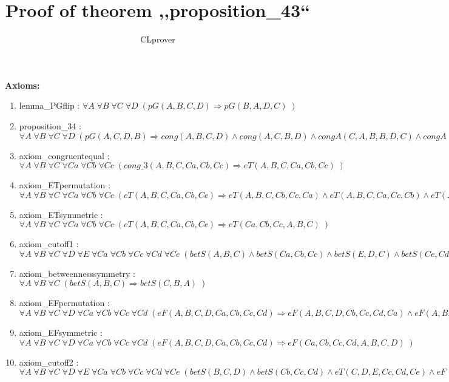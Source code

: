 \documentclass{article}
\begin{document}
\title{Proof of theorem ,,proposition\_43``}
\author{CLprover}
\maketitle

\noindent 
{\bfseries Axioms:} 
\begin{enumerate}
\item lemma\_PGflip : $\forall A \; \forall B \; \forall C \; \forall D \; ( pG(A, B, C, D) \Rightarrow pG(B, A, D, C)\;)$
\item proposition\_34 : $\forall A \; \forall B \; \forall C \; \forall D \; ( pG(A, C, D, B) \Rightarrow cong(A, B, C, D)\wedge cong(A, C, B, D)\wedge congA(C, A, B, B, D, C)\wedge congA(A, B, D, D, C, A)\wedge cong\_3(C, A, B, B, D, C)\;)$
\item axiom\_congruentequal : $\forall A \; \forall B \; \forall C \; \forall Ca \; \forall Cb \; \forall Cc \; ( cong\_3(A, B, C, Ca, Cb, Cc) \Rightarrow eT(A, B, C, Ca, Cb, Cc)\;)$
\item axiom\_ETpermutation : $\forall A \; \forall B \; \forall C \; \forall Ca \; \forall Cb \; \forall Cc \; ( eT(A, B, C, Ca, Cb, Cc) \Rightarrow eT(A, B, C, Cb, Cc, Ca)\wedge eT(A, B, C, Ca, Cc, Cb)\wedge eT(A, B, C, Cb, Ca, Cc)\wedge eT(A, B, C, Cc, Cb, Ca)\wedge eT(A, B, C, Cc, Ca, Cb)\;)$
\item axiom\_ETsymmetric : $\forall A \; \forall B \; \forall C \; \forall Ca \; \forall Cb \; \forall Cc \; ( eT(A, B, C, Ca, Cb, Cc) \Rightarrow eT(Ca, Cb, Cc, A, B, C)\;)$
\item axiom\_cutoff1 : $\forall A \; \forall B \; \forall C \; \forall D \; \forall E \; \forall Ca \; \forall Cb \; \forall Cc \; \forall Cd \; \forall Ce \; ( betS(A, B, C)\wedge betS(Ca, Cb, Cc)\wedge betS(E, D, C)\wedge betS(Ce, Cd, Cc)\wedge eT(B, C, D, Cb, Cc, Cd)\wedge eT(A, C, E, Ca, Cc, Ce) \Rightarrow eF(A, B, D, E, Ca, Cb, Cd, Ce)\;)$
\item axiom\_betweennesssymmetry : $\forall A \; \forall B \; \forall C \; ( betS(A, B, C) \Rightarrow betS(C, B, A)\;)$
\item axiom\_EFpermutation : $\forall A \; \forall B \; \forall C \; \forall D \; \forall Ca \; \forall Cb \; \forall Cc \; \forall Cd \; ( eF(A, B, C, D, Ca, Cb, Cc, Cd) \Rightarrow eF(A, B, C, D, Cb, Cc, Cd, Ca)\wedge eF(A, B, C, D, Cd, Cc, Cb, Ca)\wedge eF(A, B, C, D, Cc, Cd, Ca, Cb)\wedge eF(A, B, C, D, Cb, Ca, Cd, Cc)\wedge eF(A, B, C, D, Cd, Ca, Cb, Cc)\wedge eF(A, B, C, D, Cc, Cb, Ca, Cd)\wedge eF(A, B, C, D, Ca, Cd, Cc, Cb)\;)$
\item axiom\_EFsymmetric : $\forall A \; \forall B \; \forall C \; \forall D \; \forall Ca \; \forall Cb \; \forall Cc \; \forall Cd \; ( eF(A, B, C, D, Ca, Cb, Cc, Cd) \Rightarrow eF(Ca, Cb, Cc, Cd, A, B, C, D)\;)$
\item axiom\_cutoff2 : $\forall A \; \forall B \; \forall C \; \forall D \; \forall E \; \forall Ca \; \forall Cb \; \forall Cc \; \forall Cd \; \forall Ce \; ( betS(B, C, D)\wedge betS(Cb, Cc, Cd)\wedge eT(C, D, E, Cc, Cd, Ce)\wedge eF(A, B, D, E, Ca, Cb, Cd, Ce) \Rightarrow eF(A, B, C, E, Ca, Cb, Cc, Ce)\;)$
\end{enumerate}
\end{document}
